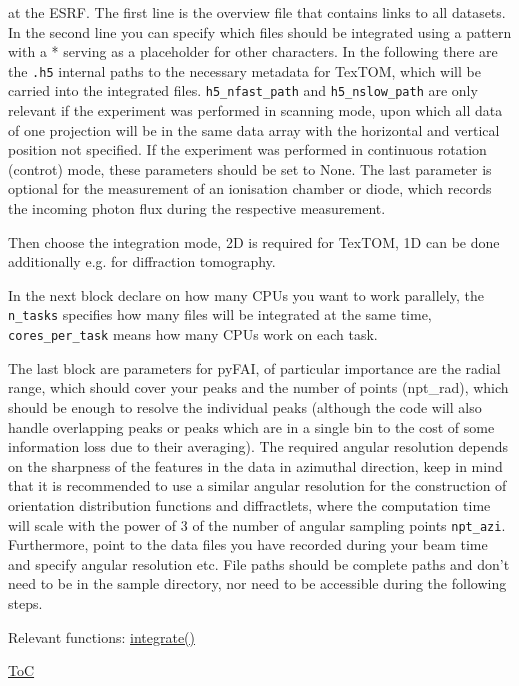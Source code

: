 at the ESRF. The first line is the overview file that contains links to all datasets. In the second line you can
specify which files should be integrated using a pattern with a * serving as a placeholder for other characters.
In the following there are the \texttt{.h5} internal paths to the necessary metadata for TexTOM, which will be carried into the
integrated files. \texttt{h5\_nfast\_path} and \texttt{h5\_nslow\_path} are only relevant if the experiment was performed in scanning mode,
upon which all data of one projection will be in the same data array with the horizontal and vertical position not specified.
If the experiment was performed in continuous rotation (controt) mode, these parameters should be set to None.
The last parameter is optional for the measurement of an ionisation chamber or diode, which records the incoming photon
flux during the respective measurement.

Then choose the integration mode, 2D is required for TexTOM, 1D can be done additionally e.g. for diffraction tomography.

In the next block declare on how many CPUs you want to work parallely, the \texttt{n\_tasks} specifies how many files will be integrated
at the same time, \texttt{cores\_per\_task} means how many CPUs work on each task.

The last block are parameters for pyFAI, of particular importance are the radial range, which should cover your peaks
and the number of points (npt\_rad), which should be enough to resolve the individual peaks (although the code will
also handle overlapping peaks or peaks which are in a single bin to the cost of some information loss due to their averaging).
The required angular resolution depends on the sharpness of the features in the data in azimuthal direction,
keep in mind that it is recommended to use a similar angular resolution for the construction of orientation
distribution functions and diffractlets, where the computation time will scale with the power of 3 of the number
of angular sampling points \texttt{npt\_azi}.  
Furthermore, point to the data files you have recorded during your beam time and specify angular resolution etc.
File paths should be complete paths and don't need to be in the sample directory, nor need to be accessible
during the following steps.

Relevant functions:
\hyperref[fun:integrate]{integrate()}

\begin{flushright}
    \hyperref[toc]{ToC}
\end{flushright}


